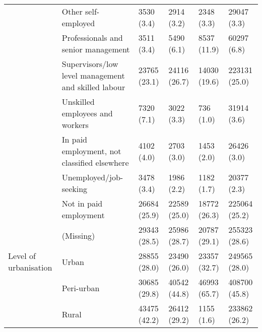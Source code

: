 \begin{tabular}{llllll}
 & Other self-employed & 3530 (3.4) & 2914 (3.2) & 2348 (3.3) & 29047 (3.3)\\
 & Professionals and senior management & 3511 (3.4) & 5490 (6.1) & 8537 (11.9) & 60297 (6.8)\\
 & Supervisors/low level management and skilled labour & 23765 (23.1) & 24116 (26.7) & 14030 (19.6) & 223131 (25.0)\\
 & Unskilled employees and workers & 7320 (7.1) & 3022 (3.3) & 736 (1.0) & 31914 (3.6)\\
 & In paid employment, not classified elsewhere & 4102 (4.0) & 2703 (3.0) & 1453 (2.0) & 26426 (3.0)\\
 & Unemployed/job-seeking & 3478 (3.4) & 1986 (2.2) & 1182 (1.7) & 20377 (2.3)\\
 & Not in paid employment & 26684 (25.9) & 22589 (25.0) & 18772 (26.3) & 225064 (25.2)\\
 & (Missing) & 29343 (28.5) & 25986 (28.7) & 20787 (29.1) & 255323 (28.6)\\
\addlinespace
Level of urbanisation & Urban & 28855 (28.0) & 23490 (26.0) & 23357 (32.7) & 249565 (28.0)\\
 & Peri-urban & 30685 (29.8) & 40542 (44.8) & 46993 (65.7) & 408700 (45.8)\\
 & Rural & 43475 (42.2) & 26412 (29.2) & 1155 (1.6) & 233862 (26.2)\\
\bottomrule
\end{tabular}